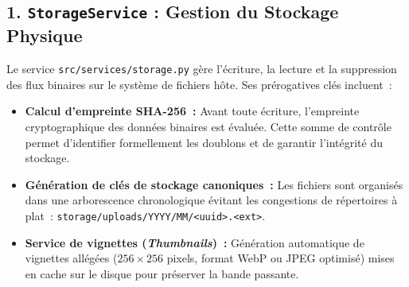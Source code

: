 \subsection{1. \texttt{StorageService} : Gestion du Stockage Physique}
Le service \texttt{src/services/storage.py} gère l'écriture, la lecture et la suppression des flux binaires sur le système de fichiers hôte. Ses prérogatives clés incluent~:
\begin{itemize}
    \item \textbf{Calcul d'empreinte SHA-256~:} Avant toute écriture, l'empreinte cryptographique des données binaires est évaluée. Cette somme de contrôle permet d'identifier formellement les doublons et de garantir l'intégrité du stockage.
    \item \textbf{Génération de clés de stockage canoniques~:} Les fichiers sont organisés dans une arborescence chronologique évitant les congestions de répertoires à plat~: \texttt{storage/uploads/YYYY/MM/<uuid>.<ext>}.
    \item \textbf{Service de vignettes (\textit{Thumbnails})~:} Génération automatique de vignettes allégées ($256 \times 256$ pixels, format WebP ou JPEG optimisé) mises en cache sur le disque pour préserver la bande passante.
\end{itemize}

